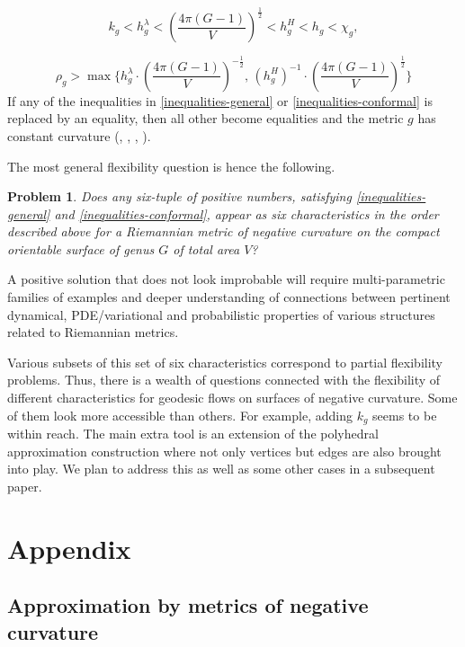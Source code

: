 \documentclass[12pt]{article}
\numberwithin{equation}{section}
\newtheorem{problem}{Problem}
\theoremstyle{definition}
\begin{document}
\begin{equation}\label{inequalities-general}
k_g<h_g^\lambda < \left(\frac{4\pi(G-1)}{V}\right)^{\frac{1}{2}}< h_g^H<h_g<\chi_g, 
\end{equation}

\begin{equation}\label{inequalities-conformal}
 \rho_g>\max\{h_g^\lambda\cdot\left(\frac{4\pi(G-1)}{V}\right)^{-\frac{1}{2}}, \,(h_g^H)^{-1}\cdot\left(\frac{4\pi(G-1)}{V}\right)^{\frac{1}{2}}\}
 \end{equation}
 If any of the  inequalities in \eqref{inequalities-general} or \eqref{inequalities-conformal} is replaced by an equality, then all other become equalities and the metric $g$ has constant curvature (\cite{OS84}, \cite{K82}, \cite{LY85}, \cite{L90}). 
 
 The most general flexibility question is  hence the following.
 \begin{problem} Does any six-tuple of positive numbers, satisfying \eqref{inequalities-general} and \eqref{inequalities-conformal}, appear as  six characteristics in the order described above for a Riemannian metric of negative curvature on  the compact orientable surface of genus $G$  of total area $V$?
 \end{problem} 
 A positive solution  that  does not look improbable will require multi-parametric families of examples and deeper understanding of connections between  pertinent dynamical, PDE/variational and probabilistic properties of various structures related to Riemannian metrics. 
 
 Various subsets of this set of six characteristics correspond to partial flexibility problems. Thus, there is a wealth of questions connected with the flexibility of different characteristics for geodesic flows on surfaces of  negative curvature.
 Some of them look more accessible than others. For example, adding $k_g$ seems to be within reach. The main extra tool is an extension of the polyhedral approximation construction where not only vertices but edges are also brought into play. We plan to address this as well as some other cases in a subsequent paper. 
 





\section{Appendix}

\subsection{Approximation  by metrics of negative curvature}
\end{document}
